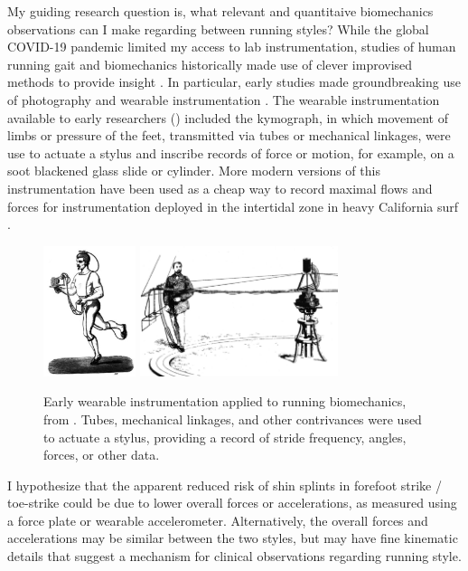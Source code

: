 My guiding research question is, what relevant and quantitaive biomechanics observations can I make regarding between running styles?  While the global COVID-19 pandemic limited my access to lab instrumentation, studies of human running gait and biomechanics historically made use of clever improvised methods to provide insight \citep{baker2007history, mcmahon1984muscles, mayer2010physiological, marey1873locomotion, carlet1872essai, muybridge1901human}. In particular, early studies made groundbreaking use of photography \citep{muybridge1901human, baker2007history, mcmahon1984muscles, mayer2010physiological} and wearable instrumentation \citep{marey1873locomotion, carlet1872essai, baker2007history, mayer2010physiological}. The wearable instrumentation available to early researchers () included the kymograph, in which movement of limbs or pressure of the feet, transmitted via tubes or mechanical linkages, were use to actuate a stylus and inscribe records of force or motion, for example, on a soot blackened glass slide or cylinder. More modern versions of this instrumentation have been used as a cheap way to record maximal flows and forces for instrumentation deployed in the intertidal zone in heavy California surf \citep{bell1984quantifying, denny1983simple}.
\begin{figure}
\begin{center}
\includegraphics[height=1.5in]{figures/intro3.png}\hspace{0.5in}
\includegraphics[height=1.5in]{figures/intro4.png}
\end{center}
\caption{Early wearable instrumentation applied to running biomechanics, from \citep{marey1873locomotion, carlet1872essai}. Tubes, mechanical linkages, and other contrivances were used to actuate a stylus, providing a record of stride frequency, angles, forces, or other data.} 
\label{fig:intro}
\end{figure}

I hypothesize that the apparent reduced risk of shin splints in forefoot strike / toe-strike could be due to lower overall forces or accelerations, as measured using a force plate or wearable accelerometer. Alternatively, the overall forces and accelerations may be similar between the two styles, but may have fine kinematic details that suggest a mechanism for clinical observations regarding running style. 



